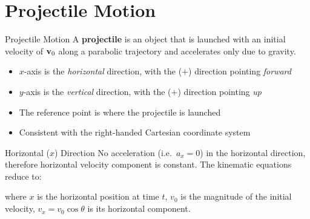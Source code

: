 \documentclass[12pt,compress,aspectratio=169]{beamer}
\newcommand{\mb}[1]{\ensuremath\mathbf{#1}}
\newcommand{\eq}[2]{\vspace{#1}{\Large\begin{displaymath}#2\end{displaymath}}}
\begin{document}
\section{Projectile Motion}

\begin{frame}{Projectile Motion}
  A \textbf{projectile} is an object that is launched with an initial velocity
  of $\mb{v}_0$ along a parabolic trajectory and accelerates only due to
  gravity.
  \begin{center}
  \end{center}
  \begin{itemize}
  \item $x$-axis is the \emph{horizontal} direction, with the ($+$) direction
    pointing \emph{forward}
  \item $y$-axis is the \emph{vertical} direction, with the ($+$) direction
    pointing \emph{up}
  \item The reference point is where the projectile is launched
  \item Consistent with the right-handed Cartesian coordinate system
  \end{itemize}
\end{frame}



\begin{frame}{Horizontal ($x$) Direction}
  No acceleration (i.e.\ $a_x=0$) in the horizontal direction, therefore
  horizontal velocity component is constant. The kinematic equations reduce to:

  \eq{-.2in}{
    x=v_xt=\left[v_0\cos\theta\right] t
  }

  where $x$ is the horizontal position at time $t$, $v_0$ is the
  magnitude of the initial velocity, $v_x=v_0\cos\theta$ is its horizontal
  component.
\end{frame}
\end{document}
